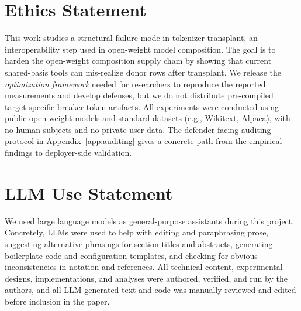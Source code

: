 

\section*{Ethics Statement}



This work studies a structural failure mode in tokenizer transplant, an interoperability step used in open-weight model composition. The goal is to harden the open-weight composition supply chain by showing that current shared-basis tools can mis-realize donor rows after transplant. We release the \textit{optimization framework} needed for researchers to reproduce the reported measurements and develop defenses, but we do not distribute pre-compiled target-specific breaker-token artifacts. All experiments were conducted using public open-weight models and standard datasets (e.g., Wikitext, Alpaca), with no human subjects and no private user data. The defender-facing auditing protocol in Appendix~\ref{app:auditing} gives a concrete path from the empirical findings to deployer-side validation.


\section*{LLM Use Statement}

We used large language models as general-purpose assistants during this project. Concretely, LLMs were used to help with editing and paraphrasing prose, suggesting alternative phrasings for section titles and abstracts, generating boilerplate code and configuration templates, and checking for obvious inconsistencies in notation and references. All technical content, experimental designs, implementations, and analyses were authored, verified, and run by the authors, and all LLM-generated text and code was manually reviewed and edited before inclusion in the paper. 
